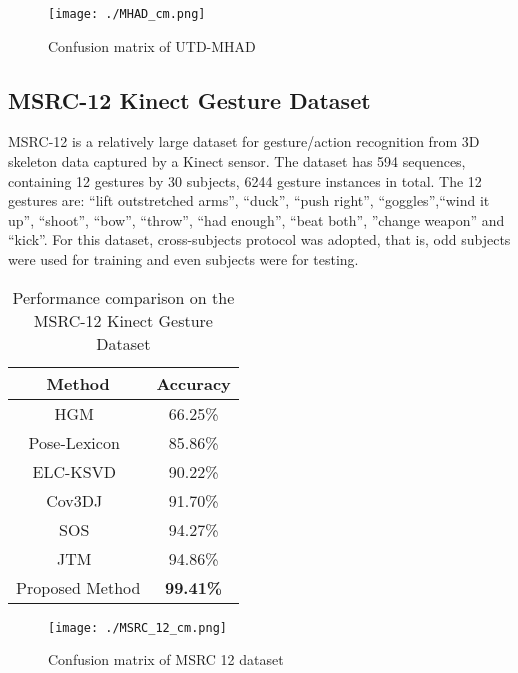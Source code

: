 \documentclass[10pt,journal]{IEEEtran}
\begin{document}
\begin{figure}[htb]
\centering
\texttt{[image: ./MHAD\_cm.png]}
\caption{Confusion matrix of UTD-MHAD}
\label{fig:map}
\end{figure}


\subsection{MSRC-12 Kinect Gesture Dataset}
MSRC-12 \cite{Fothergill2012Instructing} is a relatively large dataset for gesture/action
recognition from 3D skeleton data captured by a Kinect sensor. The dataset has 594 sequences, containing 12 gestures by 30 subjects, 6244 gesture instances in total. The 12 gestures are: “lift outstretched arms”, “duck”, “push right”, “goggles”,“wind it up”, “shoot”, “bow”, “throw”, “had enough”, “beat both”, ”change weapon” and “kick”. For this dataset, cross-subjects protocol was adopted, that is, odd subjects were used for training and even subjects were for testing.

\begin{table}[htb]
\begin{center}
\caption{Performance comparison on the MSRC-12 Kinect Gesture Dataset \cite{Shahroudy2016NTU}} \label{tab:MSRC-12}
\begin{tabular}{  c  c }
\hline
Method              &Accuracy \\
\hline
HGM~\cite{Yang2014A} &66.25\%\\
Pose-Lexicon~\cite{Zhou2016Learning} &85.86\%\\
ELC-KSVD~\cite{Zhou2014Discriminative} &90.22\%\\
Cov3DJ~\cite{Hussein2013Human}  &91.70\%\\
SOS~\cite{Hou2016Skeleton}  &94.27\%\\
JTM~\cite{Wang2016Action}& {94.86}\%\\
Proposed Method     & \bf{99.41\%}\\
\hline
\end{tabular}
\end{center}
\end{table}


\begin{figure}[htb]
\centering
\texttt{[image: ./MSRC\_12\_cm.png]}
\caption{Confusion matrix of MSRC 12 dataset}
\label{fig:map}
\end{figure}
\end{document}
